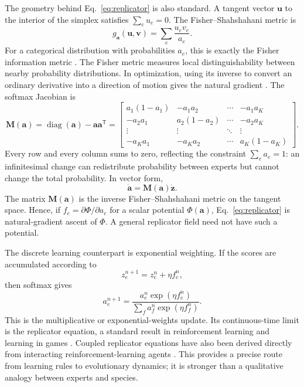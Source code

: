 \documentclass[11pt]{article}
\begin{document}
The geometry behind Eq.~\eqref{eq:replicator} is also standard. A tangent vector $\mathbf u$ to the interior of the simplex satisfies $\sum_e u_e=0$. The Fisher--Shahshahani metric is
\begin{equation}
g_{\mathbf a}(\mathbf u,\mathbf v)
=
\sum_e
\frac{u_e v_e}{a_e}.
\label{eq:shahshahani}
\end{equation}
For a categorical distribution with probabilities $a_e$, this is exactly the Fisher information metric \cite{harper2009}. The Fisher metric measures local distinguishability between nearby probability distributions. In optimization, using its inverse to convert an ordinary derivative into a direction of motion gives the natural gradient \cite{amari1998}. The softmax Jacobian is
\begin{equation}
\mathbf M(\mathbf a)
=
\operatorname{diag}(\mathbf a)
-
\mathbf a\mathbf a^{\mathsf T}
=
\begin{bmatrix}
a_1(1-a_1) & -a_1a_2 & \cdots & -a_1a_K\\
-a_2a_1 & a_2(1-a_2) & \cdots & -a_2a_K\\
\vdots & \vdots & \ddots & \vdots\\
-a_Ka_1 & -a_Ka_2 & \cdots & a_K(1-a_K)
\end{bmatrix}.
\label{eq:mobility}
\end{equation}
Every row and every column sums to zero, reflecting the constraint $\sum_e a_e=1$: an infinitesimal change can redistribute probability between experts but cannot change the total probability. In vector form,
\begin{equation}
\dot{\mathbf a}
=
\mathbf M(\mathbf a)\dot{\mathbf z}.
\label{eq:softmax-vector-dynamics}
\end{equation}
The matrix $\mathbf M(\mathbf a)$ is the inverse Fisher--Shahshahani metric on the tangent space. Hence, if $f_e=\partial\Phi/\partial a_e$ for a scalar potential $\Phi(\mathbf a)$, Eq.~\eqref{eq:replicator} is natural-gradient ascent of $\Phi$. A general replicator field need not have such a potential.

The discrete learning counterpart is exponential weighting. If the scores are accumulated according to
\begin{equation}
z_e^{n+1}
=
z_e^n
+
\eta f_e^n,
\end{equation}
then softmax gives
\begin{equation}
a_e^{n+1}
=
\frac{
a_e^n\exp(\eta f_e^n)
}{
\sum_f a_f^n\exp(\eta f_f^n)
}.
\label{eq:exponential-learning}
\end{equation}
This is the multiplicative or exponential-weights update. Its continuous-time limit is the replicator equation, a standard result in reinforcement learning and learning in games \cite{mertikopoulos2016}. Coupled replicator equations have also been derived directly from interacting reinforcement-learning agents \cite{sato2003}. This provides a precise route from learning rules to evolutionary dynamics; it is stronger than a qualitative analogy between experts and species.
\end{document}
